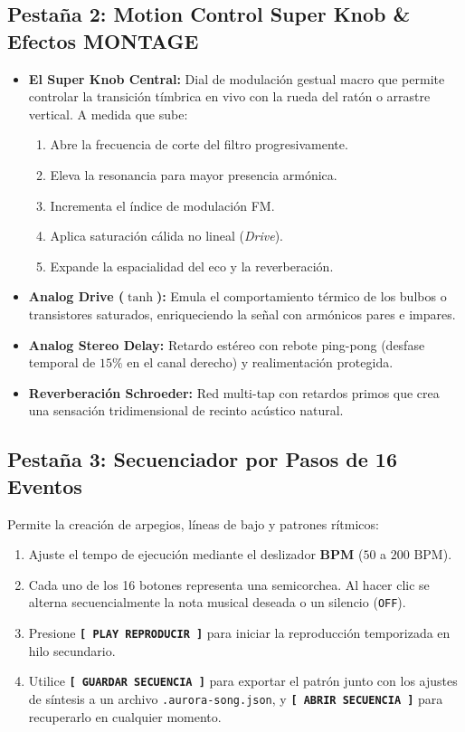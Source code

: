 \documentclass[11pt,a4paper]{article}
\begin{document}
\subsection{Pestaña 2: Motion Control Super Knob \& Efectos MONTAGE}
\begin{itemize}[leftmargin=1.5cm]
    \item \textbf{El Super Knob Central:} Dial de modulación gestual macro que permite controlar la transición tímbrica en vivo con la rueda del ratón o arrastre vertical. A medida que sube:
    \begin{enumerate}
        \item Abre la frecuencia de corte del filtro progresivamente.
        \item Eleva la resonancia para mayor presencia armónica.
        \item Incrementa el índice de modulación FM.
        \item Aplica saturación cálida no lineal (\textit{Drive}).
        \item Expande la espacialidad del eco y la reverberación.
    \end{enumerate}
    \item \textbf{Analog Drive ($\tanh$):} Emula el comportamiento térmico de los bulbos o transistores saturados, enriqueciendo la señal con armónicos pares e impares.
    \item \textbf{Analog Stereo Delay:} Retardo estéreo con rebote ping-pong (desfase temporal de $15\%$ en el canal derecho) y realimentación protegida.
    \item \textbf{Reverberación Schroeder:} Red multi-tap con retardos primos que crea una sensación tridimensional de recinto acústico natural.
\end{itemize}

\subsection{Pestaña 3: Secuenciador por Pasos de 16 Eventos}
Permite la creación de arpegios, líneas de bajo y patrones rítmicos:
\begin{enumerate}[leftmargin=1.5cm]
    \item Ajuste el tempo de ejecución mediante el deslizador \textbf{BPM} ($50$ a $200\text{ BPM}$).
    \item Cada uno de los 16 botones representa una semicorchea. Al hacer clic se alterna secuencialmente la nota musical deseada o un silencio (\texttt{OFF}).
    \item Presione \textbf{\texttt{[ PLAY REPRODUCIR ]}} para iniciar la reproducción temporizada en hilo secundario.
    \item Utilice \textbf{\texttt{[ GUARDAR SECUENCIA ]}} para exportar el patrón junto con los ajustes de síntesis a un archivo \texttt{.aurora-song.json}, y \textbf{\texttt{[ ABRIR SECUENCIA ]}} para recuperarlo en cualquier momento.
\end{enumerate}
\end{document}
